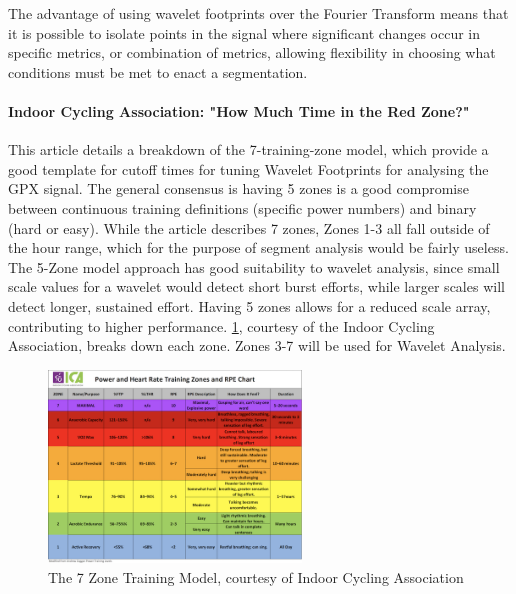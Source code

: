 \documentclass[11pt,twoside]{report}
\begin{document}
The advantage of using wavelet footprints over the Fourier Transform means that it is possible to isolate points in the signal where significant changes occur in specific metrics, or combination of metrics, allowing flexibility in choosing
what conditions must be met to enact a segmentation.

\paragraph{Indoor Cycling Association: "How Much Time in the Red Zone?"}
This article details a breakdown of the 7-training-zone model, which provide a good template for cutoff times for tuning Wavelet Footprints for analysing the GPX signal.
The general consensus is having 5 zones is a good compromise between continuous training definitions (specific power numbers) and binary (hard or easy). While the article describes 7 zones,
Zones 1-3 all fall outside of the hour range, which for the purpose of segment analysis would be fairly useless. The 5-Zone model approach
has good suitability to wavelet analysis, since small scale values for a wavelet would detect short burst efforts, while larger scales will detect longer, sustained effort.
Having 5 zones allows for a reduced scale array, contributing to higher performance. \ref{fig:7zone}, courtesy of the Indoor Cycling Association, breaks down each zone. Zones 3-7 will be used for Wavelet Analysis.
\begin{figure}[htbp!]
	\begin{center}
		\includegraphics[width=0.6\textwidth]{zones.png}
	\end{center}
	\caption{The 7 Zone Training Model, courtesy of Indoor Cycling Association}
	\label{fig:7zone}
\end{figure}
\end{document}
